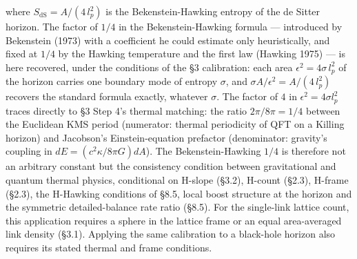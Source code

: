 \documentclass[
]{article}
\begin{document}
where \(S_{\text{dS}} = A/(4\,l_p^2)\) is the Bekenstein-Hawking entropy
of the de Sitter horizon. The factor of \(1/4\) in the
Bekenstein-Hawking formula --- introduced by Bekenstein (1973) with a
coefficient he could estimate only heuristically, and fixed at \(1/4\)
by the Hawking temperature and the first law (Hawking 1975) --- is here
recovered, under the conditions of the §3 calibration: each area
\(\epsilon^2 = 4\sigma\,l_p^2\) of the horizon carries one boundary mode
of entropy \(\sigma\), and \(\sigma A/\epsilon^2 = A / (4\,l_p^2)\)
recovers the standard formula exactly, whatever \(\sigma\). The factor
of \(4\) in \(\epsilon^2 = 4\sigma l_p^2\) traces directly to §3 Step
4's thermal matching: the ratio \(2\pi/8\pi = 1/4\) between the
Euclidean KMS period (numerator: thermal periodicity of QFT on a Killing
horizon) and Jacobson's Einstein-equation prefactor (denominator:
gravity's coupling in \(dE = (c^2\kappa/8\pi G)dA\)). The
Bekenstein-Hawking \(1/4\) is therefore not an arbitrary constant but
the consistency condition between gravitational and quantum thermal
physics, conditional on H-slope (§3.2), H-count (§2.3), H-frame (§2.3),
the H-Hawking conditions of §8.5, local boost structure at the horizon
and the symmetric detailed-balance rate ratio (§8.5). For the
single-link lattice count, this application requires a sphere in the
lattice frame or an equal area-averaged link density (§3.1). Applying
the same calibration to a black-hole horizon also requires its stated
thermal and frame conditions.
\end{document}
